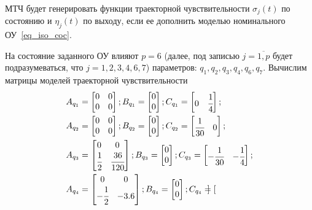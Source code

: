 МТЧ будет генерировать функции траекторной чувствительности $\sigma_j (t)$ по состоянию и $\eta_j (t)$ по выходу, если ее дополнить моделью номинального ОУ~\ref{eq_iso_coc}.

На состояние заданного ОУ влияют $p = 6$ (далее, под записью $j = \overline{1, p}$ будет подразумеваться, что $j = 1,2,3,4,6,7$) параметров: $q_1, q_2, q_3, q_4, q_6, q_7$. Вычислим матрицы моделей траекторной чувствительности
\begin{align}
	&A_{q_1} = 
	\begin{bmatrix}
		0 & 0\\
		0 & 0
	\end{bmatrix};
	B_{q_1} = 
	\begin{bmatrix}
		0\\
		0
	\end{bmatrix};
	C_{q_1} = 
	\begin{bmatrix}
		0 & \cfrac{1}{4}
	\end{bmatrix};\\
	&A_{q_2} = 
	\begin{bmatrix}
	0 & 0\\
	0 & 0
	\end{bmatrix};
	B_{q_2} = 
	\begin{bmatrix}
	0\\
	0
	\end{bmatrix};
	C_{q_2} = 
	\begin{bmatrix}
	\cfrac{1}{30} & 0
	\end{bmatrix};\\
	&A_{q_3} = 
	\begin{bmatrix}
	0 & 0\\
	\cfrac{1}{2} & \cfrac{36}{120}
	\end{bmatrix};
	B_{q_3} = 
	\begin{bmatrix}
	0\\
	0
	\end{bmatrix};
	C_{q_3} = 
	\begin{bmatrix}
	- \cfrac{1}{30} & - \cfrac{1}{4}
	\end{bmatrix};\\
	&A_{q_4} = 
	\begin{bmatrix}
	0 & 0\\
	- \cfrac{1}{2} & - 3.6
	\end{bmatrix};
	B_{q_4} = 
	\begin{bmatrix}
	0\\
	0
	\end{bmatrix};
	C_{q_4} = 
	\begin{bmatrix}

\end{bmatrix}
\end{align}
